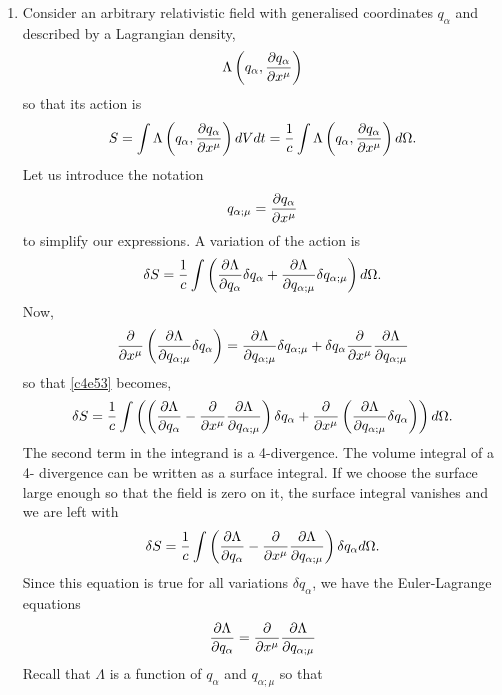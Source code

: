 \begin{enumerate}
\item Consider an arbitrary relativistic field with generalised coordinates 
$q_\alpha$ and described by a Lagrangian density,
\[
\Lambda\left(q_\alpha, \frac{\partial{q_\alpha}}{\partial{x^\mu}}\right)
\]
so that its action is
\begin{equation}\label{c4e51}
S = \int \Lambda\left(q_\alpha, \frac{\partial{q_\alpha}}{\partial{x^\mu}}\right)dV dt = \frac{1}{c}
\int\Lambda\left(q_\alpha, \frac{\partial{q_\alpha}}{\partial{x^\mu}}\right)d\Omega.
\end{equation}
Let us introduce the notation
\begin{equation}\label{c4e52}
q_{\alpha; \mu} = \frac{\partial{q_\alpha}}{\partial{x^\mu}}
\end{equation}
to simplify our expressions. A variation of the action is
\begin{equation}\label{c4e53}
\delta S = \frac{1}{c}\int\left(\frac{\partial{\Lambda}}{\partial{q_\alpha}}\delta q_\alpha +
\frac{\partial{\Lambda}}{\partial{q_{\alpha;\mu}}}\delta q_{\alpha;\mu}\right)d\Omega.
\end{equation}
Now,
\[
\frac{\partial}{\partial x^\mu}\left(\frac{\partial{\Lambda}}{\partial{q_{\alpha;\mu}}} 
\delta q_\alpha\right) = 
\frac{\partial{\Lambda}}{\partial{q_{\alpha;\mu}}}\delta q_{\alpha;\mu} + 
\delta q_\alpha\frac{\partial}
{\partial x^\mu}\frac{\partial{\Lambda}}{\partial{q_{\alpha;\mu}}}
\]
so that \eqref{c4e53} becomes,
\begin{equation}\label{c4e54}
\delta S = \frac{1}{c}\int\left(\left(\frac{\partial{\Lambda}}{\partial{q_\alpha}} - \frac{\partial}
{\partial x^\mu}\frac{\partial{\Lambda}}{\partial{q_{\alpha;\mu}}}\right)\delta q_\alpha +
\frac{\partial}{\partial x^\mu}\left(\frac{\partial{\Lambda}}{\partial{q_{\alpha;\mu}}} 
\delta q_\alpha \right)\right)d\Omega.
\end{equation}
The second term in the integrand is a 4-divergence. The volume integral of a 4-
divergence can be written as a surface integral. If we choose the surface large 
enough so that the field is zero on it, the surface integral vanishes and we are
left with
\begin{equation}\label{c4e55}
\delta S = \frac{1}{c}\int \left(\frac{\partial{\Lambda}}{\partial{q_\alpha}} - \frac{\partial}
{\partial x^\mu}\frac{\partial{\Lambda}}{\partial{q_{\alpha;\mu}}}\right)\delta q_\alpha d\Omega.
\end{equation}
Since this equation is true for all variations $\delta q_\alpha$, we have the 
Euler-Lagrange equations
\begin{equation}\label{c4e56}
\frac{\partial{\Lambda}}{\partial{q_\alpha}} = \frac{\partial}{\partial x^\mu}
\frac{\partial{\Lambda}}{\partial{q_{\alpha;\mu}}}
\end{equation}
Recall that $\Lambda$ is a function of $q_\alpha$ and $q_{\alpha;\mu}$ so that

\end{enumerate}
